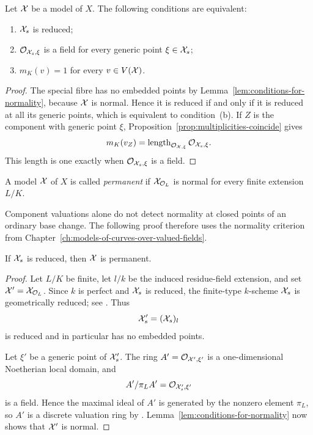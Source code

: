 \begin{proposition}\label{prop:criterion-reducedness}
    Let $\mathcal X$ be a model of $X$.
    The following conditions are equivalent:
    \begin{enumerate}[label=\textup{(\alph*)}]
        \item $\mathcal X_s$ is reduced;
        \item $\mathcal{O}_{\mathcal X_s,\xi}$ is a field for every generic point $\xi\in\mathcal X_s$;
        \item $m_K(v)=1$ for every $v\in V(\mathcal X)$.
    \end{enumerate}
\end{proposition}

\begin{proof}
    The special fibre has no embedded points by Lemma~\ref{lem:conditions-for-normality}, because $\mathcal X$ is normal.
    Hence it is reduced if and only if it is reduced at all its generic points, which is equivalent to condition~(b).
    If $Z$ is the component with generic point $\xi$, Proposition~\ref{prop:multiplicities-coincide} gives
    \[
        m_K(v_Z)=\operatorname{length}_{\mathcal{O}_{\mathcal X,\xi}}\mathcal{O}_{\mathcal X_s,\xi}.
    \]
    This length is one exactly when $\mathcal{O}_{\mathcal X_s,\xi}$ is a field.
\end{proof}

\begin{definition}\label{def:permanent-model}
    A model $\mathcal X$ of $X$ is called \textit{permanent} if $\mathcal X_{\mathcal O_L}$ is normal for every finite extension $L/K$.
\end{definition}

Component valuations alone do not detect normality at closed points of an ordinary base change.
The following proof therefore uses the normality criterion from Chapter~\ref{ch:models-of-curves-over-valued-fields}.

\begin{proposition}\label{prop:reducedness-implies-permanence}
    If $\mathcal X_s$ is reduced, then $\mathcal X$ is permanent.
\end{proposition}

\begin{proof}
    Let $L/K$ be finite, let $l/k$ be the induced residue-field extension, and set $\mathcal X'=\mathcal X_{\mathcal O_L}$.
    Since $k$ is perfect and $\mathcal X_s$ is reduced, the finite-type $k$-scheme $\mathcal X_s$ is geometrically reduced; see \cite[\href{https://stacks.math.columbia.edu/tag/020I}{Lemma 33.6.3}]{Stacks}.
    Thus
    \[
        \mathcal X'_s=(\mathcal X_s)_l
    \]
    is reduced and in particular has no embedded points.

    Let $\xi'$ be a generic point of $\mathcal X'_s$.
    The ring $A'=\mathcal{O}_{\mathcal X',\xi'}$ is a one-dimensional Noetherian local domain, and
    \[
        A'/\pi_LA'=\mathcal{O}_{\mathcal X'_s,\xi'}
    \]
    is a field.
    Hence the maximal ideal of $A'$ is generated by the nonzero element $\pi_L$, so $A'$ is a discrete valuation ring by \cite[\href{https://stacks.math.columbia.edu/tag/00PD}{Lemma 10.119.7}]{Stacks}.
    Lemma~\ref{lem:conditions-for-normality} now shows that $\mathcal X'$ is normal.
\end{proof}

